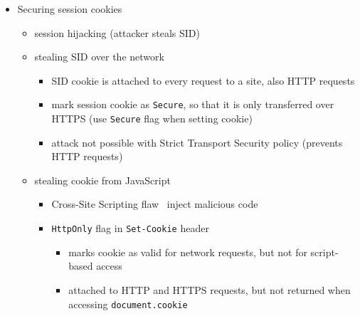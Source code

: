 \documentclass[12pt,titlepage,a4paper]{report}
\begin{document}
\begin{itemize}
				\item Securing session cookies
				\begin{itemize}
					\item session hijacking (attacker steals SID)
					\item stealing SID over the network
					\begin{itemize}
						\item SID cookie is attached to every request to a site, also HTTP requests
						\item mark session cookie as \texttt{Secure}, so that it is only transferred over HTTPS (use \texttt{Secure} flag when setting cookie)
						\item attack not possible with Strict Transport Security policy (prevents HTTP requests)
					\end{itemize}
					\item stealing cookie from JavaScript
					\begin{itemize}
						\item Cross-Site Scripting flaw \textrightarrow \, inject malicious code
						\item \texttt{HttpOnly} flag in \texttt{Set-Cookie} header
						\begin{itemize}
							\item marks cookie as valid for network requests, but not for script-based access
							\item attached to HTTP and HTTPS requests, but not returned when accessing \texttt{document.cookie}
						\end{itemize}
					\end{itemize}
				\end{itemize}
			

\end{itemize}
\end{document}
